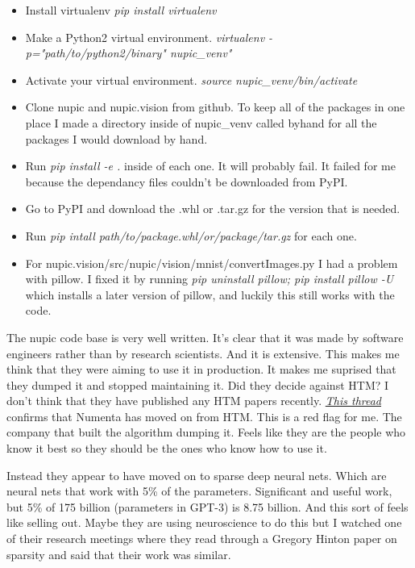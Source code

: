 \documentclass{article}
\begin{document}
\begin{itemize}
\item Install virtualenv \textit{pip install virtualenv}
\item Make a Python2 virtual environment.\textit{ virtualenv -p="path/to/python2/binary" nupic\_venv"}
\item Activate your virtual environment. 
\textit{source nupic\_venv/bin/activate}
\item Clone nupic and nupic.vision from github. To keep all of the packages in one place I made a directory inside of nupic\_venv called byhand for all the packages I would download by hand.
\item Run \textit{pip install -e .} inside of each one. It will probably fail. It failed for me because the dependancy files couldn't be downloaded from PyPI.
\item Go to PyPI and download the .whl or .tar.gz for the version that is needed. 
\item Run \textit{pip intall path/to/package.whl/or/package/tar.gz} for each one.
\item For nupic.vision/src/nupic/vision/mnist/convertImages.py I had a problem with pillow. I fixed it by running \textit{pip uninstall pillow; pip install pillow -U} which installs a later version of pillow, and luckily this still works with the code.
\end{itemize}

The nupic code base is very well written. It's clear that it was made by software engineers rather than by research scientists. And it is extensive. This makes me think that they were aiming to use it in production. It makes me suprised that they dumped it and stopped maintaining it. Did they decide against HTM? I don't think that they have published any HTM papers recently. \textit{\href{https://discourse.numenta.org/t/looking-for-research-directions-just-started-an-htm-internship-at-berkeley-labs/9802/2?u=djpasseyjr}{This thread}} confirms that Numenta has moved on from HTM. This is a red flag for me. The company that built the algorithm dumping it. Feels like they are the people who know it best so they should be the ones who know how to use it.

Instead they appear to have moved on to sparse deep neural nets. Which are neural nets that work with 5\% of the parameters. Significant and useful work, but 5\% of 175 billion (parameters in GPT-3) is 8.75 billion. And this sort of feels like selling out. Maybe they are using neuroscience to do this but I watched one of their research meetings where they read through a Gregory Hinton paper on sparsity and said that their work was similar.
\end{document}
